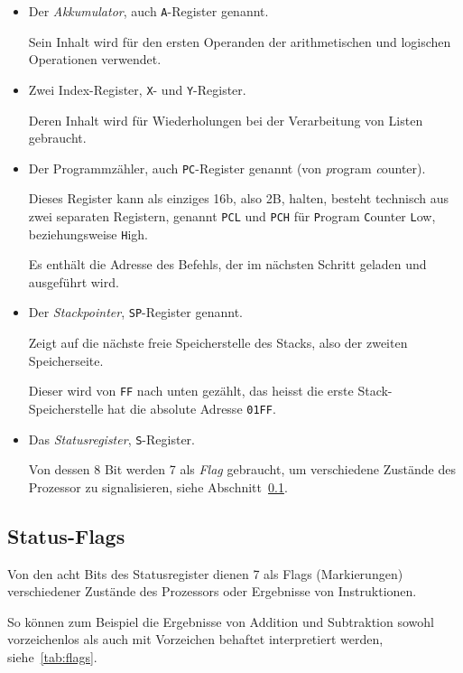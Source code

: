 \documentclass[11pt]{scrartcl}
\newcommand{\byte}{\unit{B}}
\newcommand{\bit}{\unit{b}}
\newcommand{\xreg}{\texttt{X}}
\newcommand{\yreg}{\texttt{Y}}
\newcommand{\acc}{\texttt{A}}
\newcommand{\stp}{\texttt{SP}}
\newcommand{\sreg}{\texttt{S}}
\newcommand{\pc}{\texttt{PC}}
\begin{document}
\begin{itemize}
\item Der \emph{Akkumulator}, auch \acc-Register genannt.
    
  Sein Inhalt wird für den ersten Operanden der arithmetischen und
  logischen Operationen verwendet.
\item Zwei Index-Register, \xreg- und \yreg-Register.
    
  Deren Inhalt wird für Wiederholungen bei der Verarbeitung von Listen
  gebraucht.
\item Der Programmzähler, auch \pc-Register genannt (von
  \emph{p}rogram \emph{c}ounter).

  Dieses Register kann als einziges 16\bit, also 2\byte, halten,
  besteht technisch aus zwei separaten Registern, genannt \texttt{PCL}
  und \texttt{PCH} für \texttt{P}rogram \texttt{C}ounter \texttt{L}ow,
  beziehungsweise \texttt{H}igh.
  
  Es enthält die Adresse des Befehls, der im nächsten Schritt geladen
  und ausgeführt wird.  
\item Der \emph{Stackpointer}, \stp-Register genannt.
     
  Zeigt auf die nächste freie Speicherstelle des Stacks, also der
  zweiten Speicherseite.
    
  Dieser wird von \texttt{FF} nach unten gezählt, das heisst die erste
  Stack-Speicherstelle hat die absolute Adresse \texttt{01FF}.
\item Das \emph{Statusregister}, \sreg-Register.
    
  Von dessen 8 Bit werden 7 als \emph{Flag} gebraucht, um verschiedene
  Zustände des Prozessor zu signalisieren, siehe Abschnitt~\ref{sec:flags}. 
\end{itemize}

\subsection{Status-Flags}
\label{sec:flags}

Von den acht Bits des Statusregister dienen 7 als Flags (Markierungen)
verschiedener Zustände des Prozessors oder Ergebnisse von
Instruktionen.

So können zum Beispiel die Ergebnisse von Addition und
Subtraktion sowohl vorzeichenlos als auch mit Vorzeichen behaftet
interpretiert werden, siehe~\ref{tab:flags}.
\end{document}

